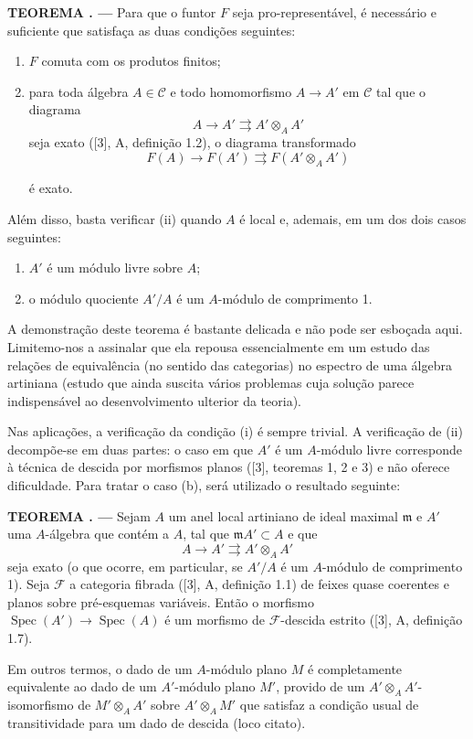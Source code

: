 \documentclass[11pt,twoside,openany]{book}
\numberwithin{equation}{section}
\newcommand{\src}[1]{%
  \phantomsection\hypertarget{src:#1}{}%
  \marginpar{\raggedleft\footnotesize\sffamily #1}%
}
\theoremstyle{plain}
\theoremstyle{definition}
\theoremstyle{remark}
\newcommand{\result}[2]{%
  \par\medskip\noindent\textbf{#1%
  \if\relax\detokenize{#2}\relax\else\space#2\fi. ---}\enspace
}
\newcommand{\FgaUnitKey}{frontmatter}
\renewcommand{\src}[1]{%
  \phantomsection\hypertarget{src:\FgaUnitKey:#1}{}%
  \marginpar{\raggedleft\footnotesize\sffamily #1}%
}
\begin{document}
\result{TEOREMA}{1} Para que o funtor $F$ seja pro-representável, é necessário
e suficiente que satisfaça as duas condições seguintes:
\begin{enumerate}
\item[(i)] $F$ comuta com os produtos finitos;
\item[(ii)] para toda álgebra $A\in\mathcal C$ e todo homomorfismo
$A\longrightarrow A'$ em $\mathcal C$ tal que o diagrama
\[
  A\longrightarrow A'\rightrightarrows A'\otimes_A A'
\]
seja exato ([3], A, definição 1.2), o diagrama transformado
\[
  F(A)\longrightarrow F(A')\rightrightarrows F(A'\otimes_A A')
\]

\src{378}
é exato.
\end{enumerate}
Além disso, basta verificar (ii) quando $A$ é local e, ademais, em um dos
dois casos seguintes:
\begin{enumerate}
\item[(a)] $A'$ é um módulo livre sobre $A$;
\item[(b)] o módulo quociente $A'/A$ é um $A$-módulo de comprimento 1.
\end{enumerate}

A demonstração deste teorema é bastante delicada e não pode ser esboçada aqui.
Limitemo-nos a assinalar que ela repousa essencialmente em um estudo das relações
de equivalência (no sentido das categorias) no espectro de uma álgebra
artiniana (estudo que ainda suscita vários problemas cuja solução parece
indispensável ao desenvolvimento ulterior da teoria).

Nas aplicações, a verificação da condição (i) é sempre trivial.
A verificação de (ii) decompõe-se em duas partes: o caso em que $A'$ é um $A$-módulo livre
corresponde à técnica de descida por morfismos planos ([3], teoremas 1, 2 e
3) e não oferece dificuldade. Para tratar o caso (b), será utilizado o resultado
seguinte:

\result{TEOREMA}{2} Sejam $A$ um anel local artiniano de ideal maximal
$\mathfrak m$ e $A'$ uma $A$-álgebra que contém a $A$, tal que
$\mathfrak mA'\subset A$ e que
\[
  A\longrightarrow A'\rightrightarrows A'\otimes_A A'
\]
seja exato (o que ocorre, em particular, se $A'/A$ é um $A$-módulo de
comprimento 1). Seja $\mathcal F$ a categoria fibrada ([3], A, definição 1.1) de
feixes quase coerentes e planos sobre pré-esquemas variáveis. Então o
morfismo $\operatorname{Spec}(A')\longrightarrow\operatorname{Spec}(A)$ é um
morfismo de $\mathcal F$-descida estrito ([3], A, definição 1.7).

Em outros termos, o dado de um $A$-módulo plano $M$ é completamente
equivalente ao dado de um $A'$-módulo plano $M'$, provido de um
$A'\otimes_AA'$-isomorfismo de $M'\otimes_AA'$ sobre $A'\otimes_AM'$ que
satisfaz a condição usual de transitividade para um dado de descida (loco
citato).
\end{document}
